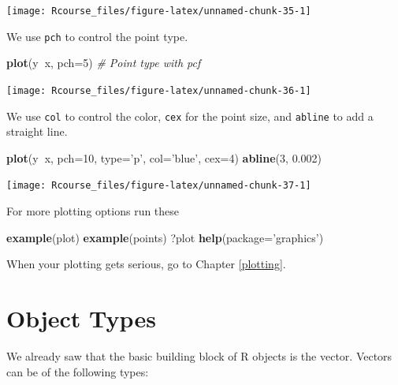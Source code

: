 \documentclass[]{book}
\newenvironment{Shaded}{\begin{snugshade}}{\end{snugshade}}
\newcommand{\KeywordTok}[1]{\textcolor[rgb]{0.13,0.29,0.53}{\textbf{#1}}}
\newcommand{\DataTypeTok}[1]{\textcolor[rgb]{0.13,0.29,0.53}{#1}}
\newcommand{\DecValTok}[1]{\textcolor[rgb]{0.00,0.00,0.81}{#1}}
\newcommand{\FloatTok}[1]{\textcolor[rgb]{0.00,0.00,0.81}{#1}}
\newcommand{\StringTok}[1]{\textcolor[rgb]{0.31,0.60,0.02}{#1}}
\newcommand{\CommentTok}[1]{\textcolor[rgb]{0.56,0.35,0.01}{\textit{#1}}}
\newcommand{\OperatorTok}[1]{\textcolor[rgb]{0.81,0.36,0.00}{\textbf{#1}}}
\newcommand{\NormalTok}[1]{#1}
\theoremstyle{definition}
\theoremstyle{definition}
\theoremstyle{definition}
\theoremstyle{remark}
\begin{document}
\texttt{[image: Rcourse\_files/figure-latex/unnamed-chunk-35-1]}

We use \texttt{pch} to control the point type.

\begin{Shaded}
\begin{Highlighting}[]
\KeywordTok{plot}\NormalTok{(y}\OperatorTok{~}\NormalTok{x, }\DataTypeTok{pch=}\DecValTok{5}\NormalTok{) }\CommentTok{# Point type with pcf}
\end{Highlighting}
\end{Shaded}

\texttt{[image: Rcourse\_files/figure-latex/unnamed-chunk-36-1]}

We use \texttt{col} to control the color, \texttt{cex} for the point
size, and \texttt{abline} to add a straight line.

\begin{Shaded}
\begin{Highlighting}[]
\KeywordTok{plot}\NormalTok{(y}\OperatorTok{~}\NormalTok{x, }\DataTypeTok{pch=}\DecValTok{10}\NormalTok{, }\DataTypeTok{type=}\StringTok{'p'}\NormalTok{, }\DataTypeTok{col=}\StringTok{'blue'}\NormalTok{, }\DataTypeTok{cex=}\DecValTok{4}\NormalTok{) }
\KeywordTok{abline}\NormalTok{(}\DecValTok{3}\NormalTok{, }\FloatTok{0.002}\NormalTok{) }
\end{Highlighting}
\end{Shaded}

\texttt{[image: Rcourse\_files/figure-latex/unnamed-chunk-37-1]}

For more plotting options run these

\begin{Shaded}
\begin{Highlighting}[]
\KeywordTok{example}\NormalTok{(plot)}
\KeywordTok{example}\NormalTok{(points)}
\NormalTok{?plot}
\KeywordTok{help}\NormalTok{(}\DataTypeTok{package=}\StringTok{'graphics'}\NormalTok{)}
\end{Highlighting}
\end{Shaded}

When your plotting gets serious, go to Chapter \ref{plotting}.

\section{Object Types}\label{object-types}

We already saw that the basic building block of R objects is the vector.
Vectors can be of the following types:
\end{document}
